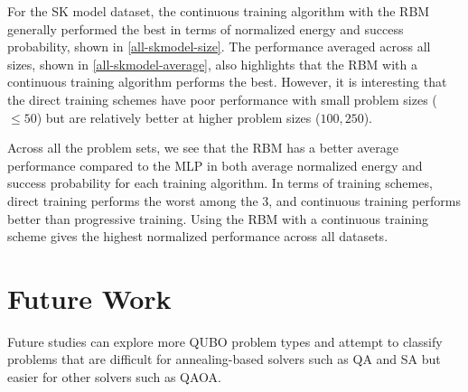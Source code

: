 For the SK model dataset, the continuous training algorithm with the RBM generally performed the best in terms of normalized energy and success probability, shown in \autoref{all-skmodel-size}. The performance averaged across all sizes, shown in \autoref{all-skmodel-average}, also highlights that the RBM with a continuous training algorithm performs the best. However, it is interesting that the direct training schemes have poor performance with small problem sizes ($\leq 50$) but are relatively better at higher problem sizes ($100, 250$).

Across all the problem sets, we see that the RBM has a better average performance compared to the MLP in both average normalized energy and success probability for each training algorithm. In terms of training schemes, direct training performs the worst among the 3, and continuous training performs better than progressive training. Using the RBM with a continuous training scheme gives the highest normalized performance across all datasets.

\section{Future Work}
Future studies can explore more QUBO problem types and attempt to classify problems that are difficult for annealing-based solvers such as QA and SA but easier for other solvers such as QAOA.